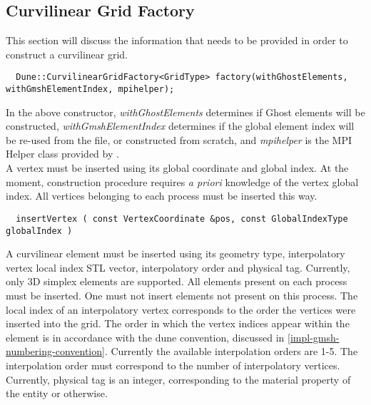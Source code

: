 \subsection{Curvilinear Grid Factory}
\label{interface-grid-factory}

This section will discuss the information that needs to be provided in order to construct a curvilinear grid. \\

\begin{mybox}
\begin{lstlisting}
  Dune::CurvilinearGridFactory<GridType> factory(withGhostElements, withGmshElementIndex, mpihelper);
\end{lstlisting}
\end{mybox}

\noindent
In the above constructor, \textit{withGhostElements} determines if Ghost elements will be constructed, \textit{withGmshElementIndex} determines if the global element index will be re-used from the \gmsh{} file, or constructed from scratch, and \textit{mpihelper} is the MPI Helper class provided by \dune{}. \\

\noindent
A vertex must be inserted using its global coordinate and global index. At the moment, \curvgrid{} construction procedure requires \textit{a priori} knowledge of the vertex global index. All vertices belonging to each process must be inserted this way. \\

\begin{mybox}
\begin{lstlisting}
  insertVertex ( const VertexCoordinate &pos, const GlobalIndexType globalIndex )
\end{lstlisting}
\end{mybox}

\noindent
A curvilinear element must be inserted using its geometry type, interpolatory vertex local index STL vector, interpolatory order and physical tag. Currently, only 3D simplex elements are supported. All elements present on each process must be inserted. One must not insert elements not present on this process. The local index of an interpolatory vertex corresponds to the order the vertices were inserted into the grid. The order in which the vertex indices appear within the element is in accordance with the dune convention, discussed in \cref{impl-gmsh-numbering-convention}. Currently the available interpolation orders are 1-5. The interpolation order must correspond to the number of interpolatory vertices. Currently, physical tag is an integer, corresponding to the material property of the entity or otherwise. \\

